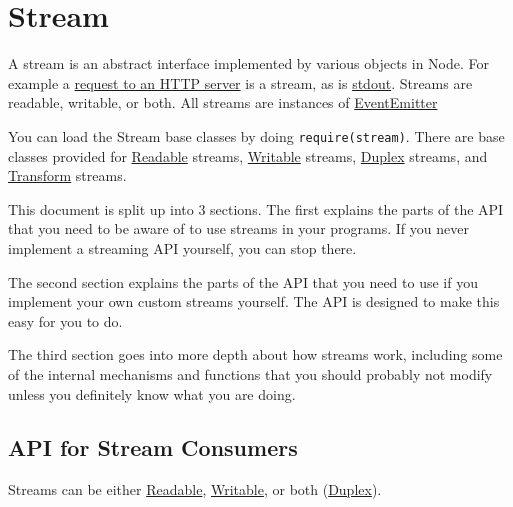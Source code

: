 \section{Stream}\label{stream}

\begin{Shaded}
\begin{Highlighting}[]
 
\end{Highlighting}
\end{Shaded}

A stream is an abstract interface implemented by various objects in
Node. For example a \href{http.html\#http_http_incomingmessage}{request
to an HTTP server} is a stream, as is
\href{process.html\#process_process_stdout}{stdout}. Streams are
readable, writable, or both. All streams are instances of
\href{events.html\#events_class_events_eventemitter}{EventEmitter}

You can load the Stream base classes by doing
\texttt{require(\textquotesingle{}stream\textquotesingle{})}. There are
base classes provided for
\hyperref[streamux5fclassux5fstreamux5freadable]{Readable} streams,
\hyperref[streamux5fclassux5fstreamux5fwritable]{Writable} streams,
\hyperref[streamux5fclassux5fstreamux5fduplex]{Duplex} streams, and
\hyperref[streamux5fclassux5fstreamux5ftransform]{Transform} streams.

This document is split up into 3 sections. The first explains the parts
of the API that you need to be aware of to use streams in your programs.
If you never implement a streaming API yourself, you can stop there.

The second section explains the parts of the API that you need to use if
you implement your own custom streams yourself. The API is designed to
make this easy for you to do.

The third section goes into more depth about how streams work, including
some of the internal mechanisms and functions that you should probably
not modify unless you definitely know what you are doing.

\subsection{API for Stream Consumers}\label{api-for-stream-consumers}

Streams can be either
\hyperref[streamux5fclassux5fstreamux5freadable]{Readable},
\hyperref[streamux5fclassux5fstreamux5fwritable]{Writable}, or both
(\hyperref[streamux5fclassux5fstreamux5fduplex]{Duplex}).


